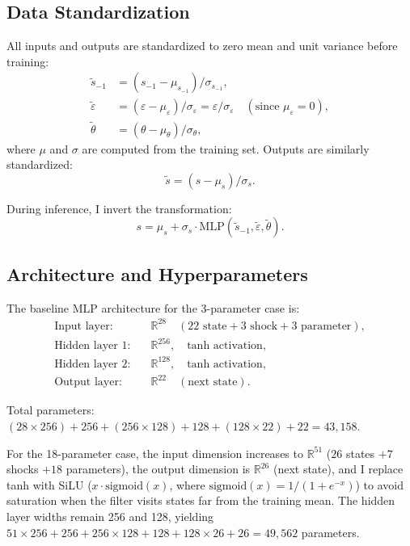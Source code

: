 \documentclass[12pt]{article}
\theoremstyle{plain}
\theoremstyle{definition}
\theoremstyle{remark}
\newcommand{\eps}{\varepsilon}
\begin{document}
\subsection{Data Standardization}

All inputs and outputs are standardized to zero mean and unit variance before training:
\begin{align}
\tilde{s}_{-1} &= (s_{-1} - \mu_{s_{-1}})/\sigma_{s_{-1}}, \\
\tilde{\eps} &= (\eps - \mu_\eps)/\sigma_\eps = \eps/\sigma_\eps \quad (\text{since } \mu_\eps=0), \\
\tilde{\theta} &= (\theta - \mu_\theta)/\sigma_\theta,
\end{align}
where $\mu$ and $\sigma$ are computed from the training set. Outputs are similarly standardized:
\begin{equation}
\tilde{s} = (s - \mu_s)/\sigma_s.
\end{equation}

During inference, I invert the transformation:
\begin{equation}
s = \mu_s + \sigma_s \cdot \text{MLP}(\tilde{s}_{-1}, \tilde{\eps}, \tilde{\theta}).
\end{equation}


\subsection{Architecture and Hyperparameters}

The baseline MLP architecture for the 3-parameter case is:
\begin{align}
\text{Input layer:} \quad & \mathbb{R}^{28} \quad (22 \text{ state} + 3 \text{ shock} + 3 \text{ parameter}), \\
\text{Hidden layer 1:} \quad & \mathbb{R}^{256}, \quad \text{tanh activation}, \\
\text{Hidden layer 2:} \quad & \mathbb{R}^{128}, \quad \text{tanh activation}, \\
\text{Output layer:} \quad & \mathbb{R}^{22} \quad (\text{next state}).
\end{align}

Total parameters: $(28 \times 256) + 256 + (256 \times 128) + 128 + (128 \times 22) + 22 = 43{,}158$.

For the 18-parameter case, the input dimension increases to $\mathbb{R}^{51}$ ($26$ states $+ 7$ shocks $+ 18$ parameters), the output dimension is $\mathbb{R}^{26}$ (next state), and I replace tanh with SiLU ($x \cdot \text{sigmoid}(x)$, where $\text{sigmoid}(x) = 1/(1+e^{-x})$) to avoid saturation when the filter visits states far from the training mean. The hidden layer widths remain 256 and 128, yielding $51 \times 256 + 256 + 256 \times 128 + 128 + 128 \times 26 + 26 = 49{,}562$ parameters.
\end{document}
